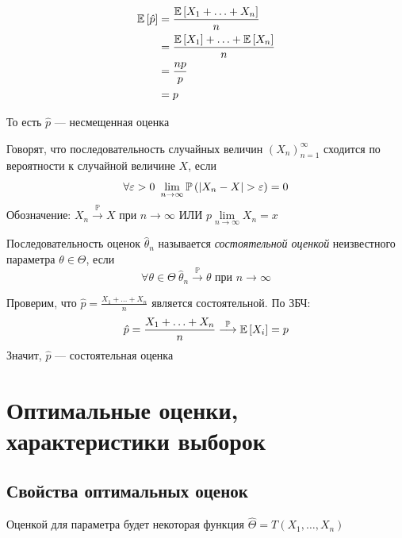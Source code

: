 \documentclass[a4paper, 10pt]{article}
\begin{document}
\begin{equation*}
    \begin{aligned}
        \mathbb{E}\left[\hat{p}\right]&=\frac{\mathbb{E}\left[X_1+\ldots+X_n\right]}{n}\\
        &=\frac{\mathbb{E}\left[X_1\right]+\ldots+\mathbb{E}\left[X_n\right]}{n}\\
        &=\frac{np}{p}\\
        &=p
    \end{aligned}
\end{equation*}

То есть $\hat{p}$ — несмещенная оценка

 Говорят, что последовательность случайных величин $(X_n)_{n=1}^{\infty}$ сходится по вероятности к случайной величине $X$, если
\begin{equation*}
    \forall \varepsilon>0\ \lim\limits_{n\to\infty}\prob{|X_n-X|>\varepsilon}=0
\end{equation*}
Обозначение: $X_n\overset{\mathbb{P}}{\longrightarrow}X$ при $n\to\infty$ ИЛИ $p\lim\limits_{n\to\infty} X_n=x$

 Последовательность оценок $\hat{\theta}_n$ называется \textit{состоятельной оценкой} неизвестного параметра $\theta\in\Theta$, если
\begin{equation*}
    \forall \theta\in\Theta\ \hat{\theta}_n\overset{\mathbb{P}}{\longrightarrow}\theta\text{ при }n\to\infty
\end{equation*}

\ex Проверим, что $\hat{p}=\displaystyle\frac{X_1+\ldots+X_n}{n}$ является состоятельной. По ЗБЧ:
\begin{equation*}
    \begin{aligned}
        \hat{p}=\displaystyle\frac{X_1+\ldots+X_n}{n}\overset{\mathbb{P}}{\longrightarrow}\mathbb{E}\left[X_i\right]=p
    \end{aligned}
\end{equation*}
Значит, $\hat{p}$ — состоятельная оценка

\newpage
\section{Оптимальные оценки, характеристики выборок}
\subsection{Свойства оптимальных оценок}
 Оценкой для параметра будет некоторая функция $\hat{\Theta}=T(X_1,\ldots,X_n)$
\end{document}
